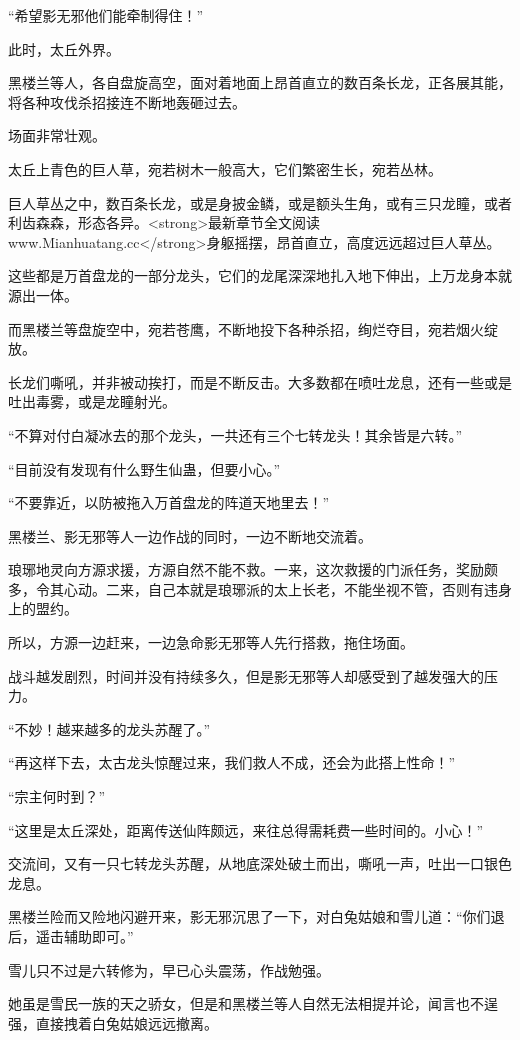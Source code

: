 \begin{this_body}
“希望影无邪他们能牵制得住！”

此时，太丘外界。

黑楼兰等人，各自盘旋高空，面对着地面上昂首直立的数百条长龙，正各展其能，将各种攻伐杀招接连不断地轰砸过去。

场面非常壮观。

太丘上青色的巨人草，宛若树木一般高大，它们繁密生长，宛若丛林。

巨人草丛之中，数百条长龙，或是身披金鳞，或是额头生角，或有三只龙瞳，或者利齿森森，形态各异。<strong>最新章节全文阅读www.Mianhuatang.cc</strong>身躯摇摆，昂首直立，高度远远超过巨人草丛。

这些都是万首盘龙的一部分龙头，它们的龙尾深深地扎入地下伸出，上万龙身本就源出一体。

而黑楼兰等盘旋空中，宛若苍鹰，不断地投下各种杀招，绚烂夺目，宛若烟火绽放。

长龙们嘶吼，并非被动挨打，而是不断反击。大多数都在喷吐龙息，还有一些或是吐出毒雾，或是龙瞳射光。

“不算对付白凝冰去的那个龙头，一共还有三个七转龙头！其余皆是六转。”

“目前没有发现有什么野生仙蛊，但要小心。”

“不要靠近，以防被拖入万首盘龙的阵道天地里去！”

黑楼兰、影无邪等人一边作战的同时，一边不断地交流着。

琅琊地灵向方源求援，方源自然不能不救。一来，这次救援的门派任务，奖励颇多，令其心动。二来，自己本就是琅琊派的太上长老，不能坐视不管，否则有违身上的盟约。

所以，方源一边赶来，一边急命影无邪等人先行搭救，拖住场面。

战斗越发剧烈，时间并没有持续多久，但是影无邪等人却感受到了越发强大的压力。

“不妙！越来越多的龙头苏醒了。”

“再这样下去，太古龙头惊醒过来，我们救人不成，还会为此搭上性命！”

“宗主何时到？”

“这里是太丘深处，距离传送仙阵颇远，来往总得需耗费一些时间的。小心！”

交流间，又有一只七转龙头苏醒，从地底深处破土而出，嘶吼一声，吐出一口银色龙息。

黑楼兰险而又险地闪避开来，影无邪沉思了一下，对白兔姑娘和雪儿道：“你们退后，遥击辅助即可。”

雪儿只不过是六转修为，早已心头震荡，作战勉强。

她虽是雪民一族的天之骄女，但是和黑楼兰等人自然无法相提并论，闻言也不逞强，直接拽着白兔姑娘远远撤离。


\end{this_body}
